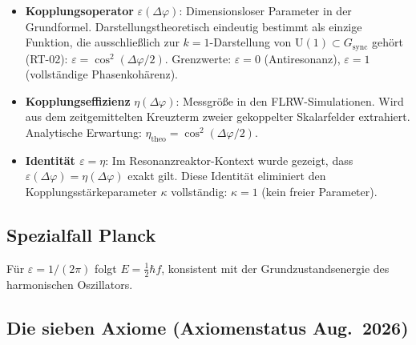 \documentclass[a4paper,11pt]{article}
\begin{document}
	\begin{itemize}
		\item \textbf{Kopplungsoperator}
		$\varepsilon(\Delta\varphi)$:
		Dimensionsloser Parameter in der Grundformel.
		Darstellungstheoretisch eindeutig bestimmt als einzige Funktion, die
		ausschlie\ss{}lich zur $k{=}1$-Darstellung von $\mathrm{U}(1) \subset G_{\mathrm{sync}}$
		geh\"ort (RT-02):
		$\varepsilon = \cos^2(\Delta\varphi/2)$.
		Grenzwerte: $\varepsilon = 0$ (Antiresonanz),
		$\varepsilon = 1$ (vollst\"andige Phasenkoh\"arenz).
		\item \textbf{Kopplungseffizienz}
		$\eta(\Delta\varphi)$:
		Messgr\"o\ss{}e in den FLRW-Simulationen. Wird aus dem
		zeitgemittelten Kreuzterm zweier gekoppelter Skalarfelder
		extrahiert. Analytische Erwartung:
		$\eta_{\mathrm{theo}} = \cos^2(\Delta\varphi/2)$.
		\item \textbf{Identit\"at $\varepsilon = \eta$}:
		Im Resonanzreaktor-Kontext wurde gezeigt, dass
		$\varepsilon(\Delta\varphi) = \eta(\Delta\varphi)$
		exakt gilt.
		Diese Identit\"at eliminiert den
		Kopplungsst\"arkeparameter $\kappa$ vollst\"andig:
		$\kappa = 1$ (kein freier Parameter).
	\end{itemize}
	
	\subsection{Spezialfall Planck}
	
	F\"ur $\varepsilon = 1/(2\pi)$ folgt
	$E = \frac{1}{2}\hbar f$, konsistent mit der
	Grundzustandsenergie des harmonischen Oszillators.
	
	\subsection{Die sieben Axiome (Axiomenstatus Aug.\ 2026)}
	
\end{document}
